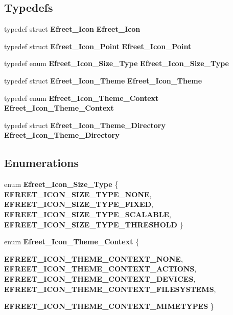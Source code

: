 \subsection*{Typedefs}
\begin{CompactItemize}
\item 
typedef struct {\bf Efreet\_\-Icon} {\bf Efreet\_\-Icon}
\item 
typedef struct {\bf Efreet\_\-Icon\_\-Point} {\bf Efreet\_\-Icon\_\-Point}
\item 
typedef enum {\bf Efreet\_\-Icon\_\-Size\_\-Type} {\bf Efreet\_\-Icon\_\-Size\_\-Type}
\item 
typedef struct {\bf Efreet\_\-Icon\_\-Theme} {\bf Efreet\_\-Icon\_\-Theme}
\item 
typedef enum {\bf Efreet\_\-Icon\_\-Theme\_\-Context} {\bf Efreet\_\-Icon\_\-Theme\_\-Context}
\item 
typedef struct {\bf Efreet\_\-Icon\_\-Theme\_\-Directory} {\bf Efreet\_\-Icon\_\-Theme\_\-Directory}
\end{CompactItemize}
\subsection*{Enumerations}
\begin{CompactItemize}
\item 
enum {\bf Efreet\_\-Icon\_\-Size\_\-Type} \{ {\bf EFREET\_\-ICON\_\-SIZE\_\-TYPE\_\-NONE}, 
{\bf EFREET\_\-ICON\_\-SIZE\_\-TYPE\_\-FIXED}, 
{\bf EFREET\_\-ICON\_\-SIZE\_\-TYPE\_\-SCALABLE}, 
{\bf EFREET\_\-ICON\_\-SIZE\_\-TYPE\_\-THRESHOLD}
 \}
\item 
enum {\bf Efreet\_\-Icon\_\-Theme\_\-Context} \{ \par
{\bf EFREET\_\-ICON\_\-THEME\_\-CONTEXT\_\-NONE}, 
{\bf EFREET\_\-ICON\_\-THEME\_\-CONTEXT\_\-ACTIONS}, 
{\bf EFREET\_\-ICON\_\-THEME\_\-CONTEXT\_\-DEVICES}, 
{\bf EFREET\_\-ICON\_\-THEME\_\-CONTEXT\_\-FILESYSTEMS}, 
\par
{\bf EFREET\_\-ICON\_\-THEME\_\-CONTEXT\_\-MIMETYPES}
 \}
\end{CompactItemize}
